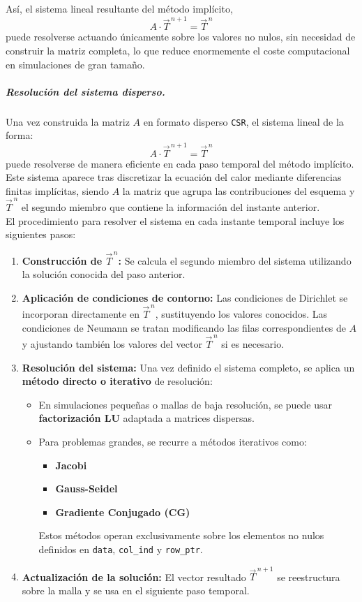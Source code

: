 \documentclass{article}
\begin{document}
\noindent
Así, el sistema lineal resultante del método implícito,
$$
A \cdot \vec{T}^{\,n+1} = \vec{T}^{\,n}
$$
puede resolverse actuando únicamente sobre los valores no nulos, sin necesidad de construir la matriz completa, lo que reduce enormemente el coste computacional en simulaciones de gran tamaño.

\subparagraph{Resolución del sistema disperso.} Una vez construida la matriz $A$ en formato disperso \texttt{CSR}, el sistema lineal de la forma:
$$
A \cdot \vec{T}^{\,n+1} = \vec{T}^{\,n}
$$
puede resolverse de manera eficiente en cada paso temporal del método implícito. Este sistema aparece tras discretizar la ecuación del calor mediante diferencias finitas implícitas, siendo $A$ la matriz que agrupa las contribuciones del esquema y $\vec{T}^{\,n}$ el segundo miembro que contiene la información del instante anterior.\\

\noindent El procedimiento para resolver el sistema en cada instante temporal incluye los siguientes pasos:

\begin{enumerate}
    \item \textbf{Construcción de $\vec{T}^{\,n}$:}  Se calcula el segundo miembro del sistema utilizando la solución conocida del paso anterior.

    \item \textbf{Aplicación de condiciones de contorno:}  
    Las condiciones de Dirichlet se incorporan directamente en $\vec{T}^{\,n}$, sustituyendo los valores conocidos. Las condiciones de Neumann se tratan modificando las filas correspondientes de $A$ y ajustando también los valores del vector $\vec{T}^{\,n}$ si es necesario.

    \item \textbf{Resolución del sistema:}  
    Una vez definido el sistema completo, se aplica un \textbf{método directo o iterativo} de resolución:
    \begin{itemize}
        \item En simulaciones pequeñas o mallas de baja resolución, se puede usar \textbf{factorización LU} adaptada a matrices dispersas.
        \item Para problemas grandes, se recurre a métodos iterativos como:
        \begin{itemize}
            \item \textbf{Jacobi}
            \item \textbf{Gauss-Seidel}
            \item \textbf{Gradiente Conjugado (CG)}
        \end{itemize}
        Estos métodos operan exclusivamente sobre los elementos no nulos definidos en \texttt{data}, \texttt{col\_ind} y \texttt{row\_ptr}.
    \end{itemize}

    \item \textbf{Actualización de la solución:}  
    El vector resultado $\vec{T}^{\,n+1}$ se reestructura sobre la malla y se usa en el siguiente paso temporal.
\end{enumerate}
\end{document}
